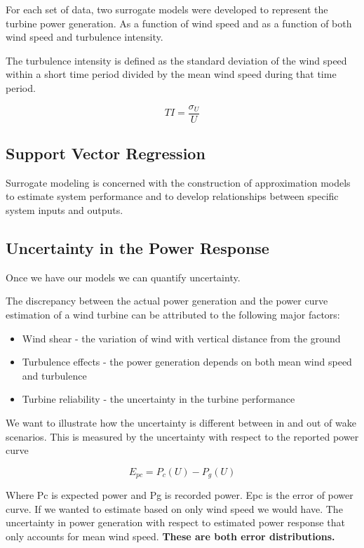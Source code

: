 \documentclass[12pt, a4paper]{report}
\begin{document}
  For each set of data, two surrogate models were developed to represent the turbine power generation. As a function of wind speed and as a function of both wind speed and turbulence intensity.

  The turbulence intensity is defined as the standard deviation of the wind speed within a short time period divided by the mean wind speed during that time period.

  \begin{equation}
    TI = \frac{\sigma_U}{U}
  \end{equation}

  \subsection{Support Vector Regression}

  Surrogate modeling is concerned with the construction of approximation models to estimate system performance and to develop relationships between specific system inputs and outputs.

  \subsection{Uncertainty in the Power Response}

  Once we have our models we can quantify uncertainty.

  The discrepancy between the actual power generation and the power curve estimation of a wind turbine can be attributed to the following major factors:

  \begin{itemize}
    \item Wind shear - the variation of wind with vertical distance from the ground
    \item Turbulence effects - the power generation depends on both mean wind speed and turbulence
    \item Turbine reliability - the uncertainty in the turbine performance
  \end{itemize}

  We want to illustrate how the uncertainty is different between in and out of wake scenarios. This is measured by the uncertainty with respect to the reported power curve

  \begin{equation}
    E_{pc} = P_c(U) - P_g(U)
  \end{equation}

  Where Pc is expected power and Pg is recorded power. Epc is the error of power curve. If we wanted to estimate based on only wind speed we would have. The uncertainty in power generation with respect to estimated power response that only accounts for mean wind speed. \textbf{These are both error distributions.}
\end{document}
